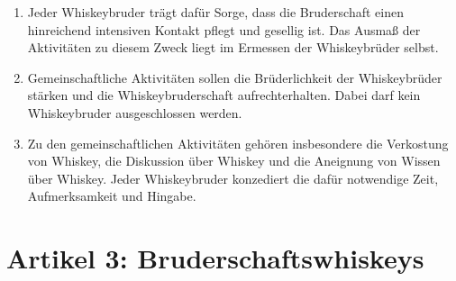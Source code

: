 \documentclass[a4paper,12pt]{article}
\begin{document}
\begin{enumerate}

\item Jeder Whiskeybruder trägt dafür Sorge, dass die Bruderschaft einen hinreichend intensiven
  Kontakt pflegt und gesellig ist. Das Ausmaß der Aktivitäten zu diesem Zweck liegt im Ermessen der
  Whiskeybrüder selbst.

\item Gemeinschaftliche Aktivitäten sollen die Brüderlichkeit der Whiskeybrüder stärken und die
  Whiskeybruderschaft aufrechterhalten. Dabei darf kein Whiskeybruder ausgeschlossen werden.

\item Zu den gemeinschaftlichen Aktivitäten gehören insbesondere die Verkostung von Whiskey, die
  Diskussion über Whiskey und die Aneignung von Wissen über Whiskey. Jeder Whiskeybruder konzediert
  die dafür notwendige Zeit, Aufmerksamkeit und Hingabe.

\end{enumerate}



\section*{Artikel 3: Bruderschaftswhiskeys}
\end{document}
